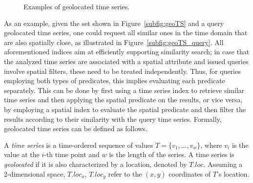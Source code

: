 \begin{figure}[!ht]
 \centering
  \quad
\caption{Examples of geolocated time series.}
\label{fig:geoTS_examples}
\end{figure}

As an example, given the set shown in Figure~\ref{subfig:geoTS} and a query geolocated time series, one could request all similar ones in the time domain that are also spatially close, as illustrated in Figure~\ref{subfig:geoTS_query}. All aforementioned indices aim at efficiently supporting similarity search; in case that the analyzed time series are associated with a spatial attribute and issued queries involve spatial filters, these need to be treated independently. Thus, for queries employing both types of predicates, this implies evaluating each predicate separately. This can be done by first using a time series index to retrieve similar time series and then applying the spatial predicate on the results, or vice versa, by employing a spatial index to evaluate the spatial predicate and then filter the results according to their similarity with the query time series. Formally, geolocated time series can be defined as follows.

\begin{mydefinition} 
A {\em time series} is a time-ordered sequence of values $T = \{v_1, \ldots, v_w\}$, where $v_i$ is the value at the $i$-th time point and $w$ is the length of the series. A time series is \textit{geolocated} if it is also characterized by a location, denoted by $T.loc$. Assuming a 2-dimensional space, $T.loc_x$, $T.loc_y$ refer to the $(x,y)$ coordinates of $T$'s location.
\end{mydefinition}

